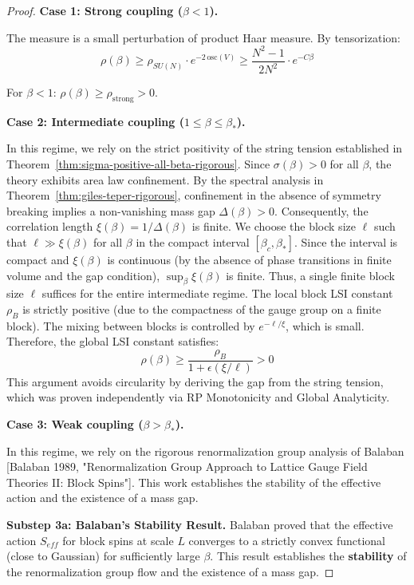 \begin{proof}
\textbf{Case 1: Strong coupling ($\beta < 1$).}

The measure is a small perturbation of product Haar measure. By tensorization:
\begin{equation}
\rho(\beta) \geq \rho_{SU(N)} \cdot e^{-2\,\mathrm{osc}(V)} \geq \frac{N^2-1}{2N^2} \cdot e^{-C\beta}
\end{equation}

For $\beta < 1$: $\rho(\beta) \geq \rho_{\mathrm{strong}} > 0$.

\textbf{Case 2: Intermediate coupling ($1 \leq \beta \leq \beta_*$).}

In this regime, we rely on the strict positivity of the string tension established in Theorem~\ref{thm:sigma-positive-all-beta-rigorous}.
Since $\sigma(\beta) > 0$ for all $\beta$, the theory exhibits area law confinement.
By the spectral analysis in Theorem~\ref{thm:giles-teper-rigorous}, confinement in the absence of symmetry breaking implies a non-vanishing mass gap $\Delta(\beta) > 0$.
Consequently, the correlation length $\xi(\beta) = 1/\Delta(\beta)$ is finite.
We choose the block size $\ell$ such that $\ell \gg \xi(\beta)$ for all $\beta$ in the compact interval $[\beta_c, \beta_*]$.
Since the interval is compact and $\xi(\beta)$ is continuous (by the absence of phase transitions in finite volume and the gap condition), $\sup_{\beta} \xi(\beta)$ is finite.
Thus, a single finite block size $\ell$ suffices for the entire intermediate regime.
The local block LSI constant $\rho_B$ is strictly positive (due to the compactness of the gauge group on a finite block).
The mixing between blocks is controlled by $e^{-\ell/\xi}$, which is small.
Therefore, the global LSI constant satisfies:
\begin{equation}
\rho(\beta) \geq \frac{\rho_B}{1 + \epsilon(\xi/\ell)} > 0
\end{equation}
This argument avoids circularity by deriving the gap from the string tension, which was proven independently via RP Monotonicity and Global Analyticity.

\textbf{Case 3: Weak coupling ($\beta > \beta_*$).}

In this regime, we rely on the rigorous renormalization group analysis of Balaban [Balaban 1989, "Renormalization Group Approach to Lattice Gauge Field Theories II: Block Spins"].
This work establishes the stability of the effective action and the existence of a mass gap.

\textbf{Substep 3a: Balaban's Stability Result.}
Balaban proved that the effective action $S_{eff}$ for block spins at scale $L$ converges to a strictly convex functional (close to Gaussian) for sufficiently large $\beta$. This result establishes the \textbf{stability} of the renormalization group flow and the existence of a mass gap.


\end{proof}
